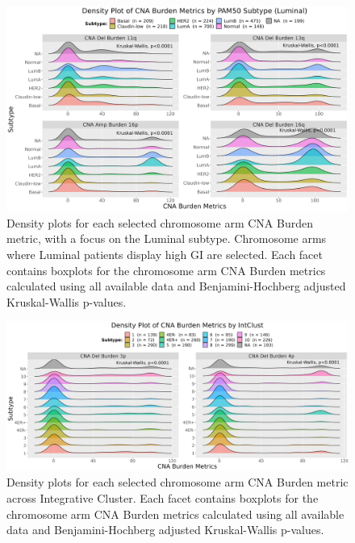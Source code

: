 \begin{figure}[!htb]
\center
\includegraphics[width=1\textwidth]{../figures/Chapter_2/ChrArm_CNA_Burden_Metrics_Across_PAM50_Luminal_Burden.png}
\caption[Density plots for each selected chromosome arm CNA Burden metric, with a focus on the Luminal subtype.]{Density plots for each selected chromosome arm CNA Burden metric, with a focus on the Luminal subtype. Chromosome arms where Luminal patients display high GI are selected. Each facet contains boxplots for the chromosome arm CNA Burden metrics calculated using all available data and Benjamini-Hochberg adjusted Kruskal-Wallis p-values.}
\label{fig:PA-CNA-Score-Metric-Density-P50-16q}
\end{figure}

\begin{figure}[!htb]
\center
\includegraphics[width=1\textwidth]{../figures/Chapter_2/ChrArm_CNA_Burden_Metrics_Across_IC.png}
\caption[Density plots for each selected chromosome arm CNA Burden metric across Integrative Cluster.]{Density plots for each selected chromosome arm CNA Burden metric across Integrative Cluster. Each facet contains boxplots for the chromosome arm CNA Burden metrics calculated using all available data and Benjamini-Hochberg adjusted Kruskal-Wallis p-values.}
\label{fig:PA_IC}
\end{figure}

